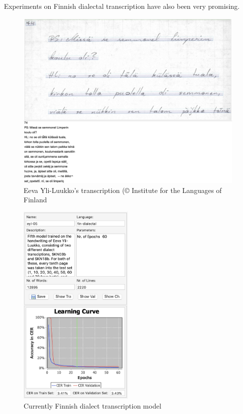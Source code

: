 \documentclass[]{book}
\begin{document}
Experiments on Finnish dialectal transcription have also been very promising.

\begin{figure}
\centering
\includegraphics{images/transkribus_skn.jpg}
\caption{Eeva Yli-Luukko's transcription (© Institute for the Languages of Finland}
\end{figure}

\begin{figure}
\centering
\includegraphics[width=0.5\textwidth,height=\textheight]{images/transkribus_skn_model.jpg}
\caption{Currently Finnish dialect transcription model}
\end{figure}
\end{document}
